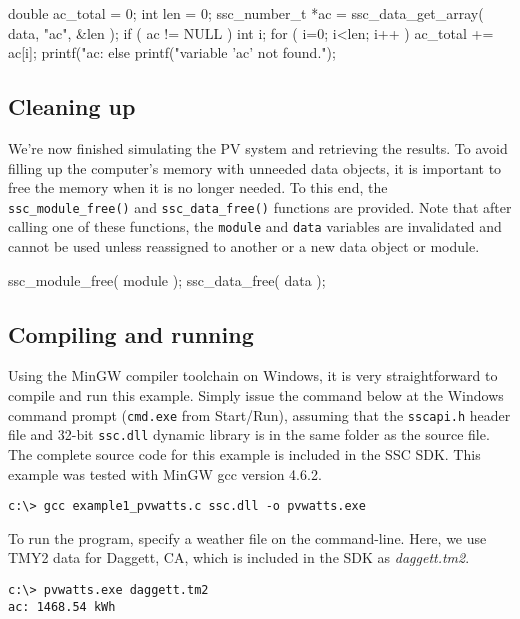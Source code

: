 \documentclass{article}
\begin{document}
\begin{verbatimtab}[4]
	double ac_total = 0;
	int len = 0;
	ssc_number_t *ac = ssc_data_get_array( data, "ac", &len );
	if ( ac != NULL )
	{
		int i;
		for ( i=0; i<len; i++ )
			ac_total += ac[i];
		printf("ac: %
	}
	else
	{
		printf("variable 'ac' not found.\n");
	}
\end{verbatimtab}

\subsection{Cleaning up}

We're now finished simulating the PV system and retrieving the results.  To avoid filling up the computer's memory with unneeded data objects, it is important to free the memory when it is no longer needed.  To this end, the \texttt{ssc\_module\_free()} and \texttt{ssc\_data\_free()} functions are provided.  Note that after calling one of these functions, the \texttt{module} and \texttt{data} variables are invalidated and cannot be used unless reassigned to another or a new data object or module.

\begin{verbatimtab}	
	ssc_module_free( module );
	ssc_data_free( data );
\end{verbatimtab}

\subsection{Compiling and running}

Using the MinGW compiler toolchain on Windows, it is very straightforward to compile and run this example.  Simply issue the command below at the Windows command prompt (\texttt{cmd.exe} from Start/Run), assuming that the \texttt{sscapi.h} header file and 32-bit \texttt{ssc.dll} dynamic library is in the same folder as the source file.  The complete source code for this example is included in the SSC SDK.  This example was tested with MinGW gcc version 4.6.2.

\begin{verbatim}
c:\> gcc example1_pvwatts.c ssc.dll -o pvwatts.exe
\end{verbatim}

To run the program, specify a weather file on the command-line.  Here, we use TMY2 data for Daggett, CA, which is included in the SDK as \emph{daggett.tm2}.

\begin{verbatim}
c:\> pvwatts.exe daggett.tm2
ac: 1468.54 kWh
\end{verbatim}
\end{document}
